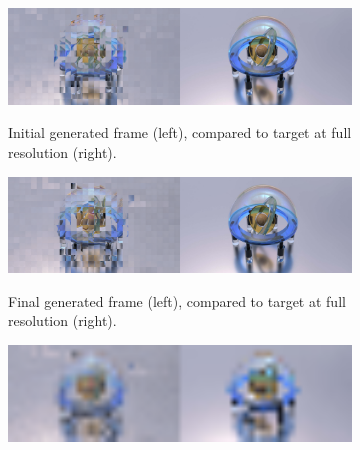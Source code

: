 \documentclass[letterpaper]{article} %
\begin{document}
\begin{figure}[h!]
\centering
\begin{subfigure}{\textwidth}
\begin{center}
\begin{minipage}[t]{0.95\linewidth}
\begin{centering}
{\includegraphics[width=\linewidth]{initial_full.png}}
\caption{Initial generated frame (left), compared to target at full resolution 
(right).}
\label{fig:initial_full}
\end{centering}
\end{minipage}
\end{center}
\end{subfigure}
\par\bigskip
\begin{subfigure}{\textwidth}
\begin{center}
\begin{minipage}[t]{0.95\linewidth}
\begin{centering}
{\includegraphics[width=\linewidth]{subdiv_full.png}}
\caption{Final generated frame (left), compared to target at full resolution 
(right).}
\label{fig:subdiv_full}
\end{centering}
\end{minipage}
\end{center}
\end{subfigure}
\par\bigskip
\begin{subfigure}{\textwidth}
\begin{center}
\begin{minipage}[t]{0.95\linewidth}
\begin{centering}
{\includegraphics[width=\linewidth]{subdiv_avg.png}}

\end{centering}
\end{minipage}
\end{center}
\end{subfigure}
\end{figure}
\end{document}
